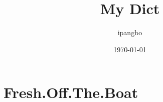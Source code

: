 \documentclass[11pt,a4paper]{ctexbook}
\title{{\Huge{\textbf{My Dict}}}}
\author{ipangbo}
\date{\today}
\begin{document}
\maketitle

\tableofcontents


\chapter{Fresh.Off.The.Boat}
\newpage


\end{document}
